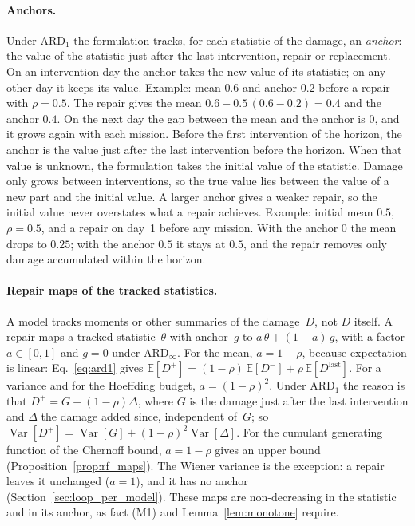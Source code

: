 \documentclass[11pt,a4paper]{article}
\theoremstyle{plain}
\theoremstyle{definition}
\theoremstyle{remark}
\begin{document}
\paragraph{Anchors.}
Under $\text{ARD}_1$ the formulation tracks, for each statistic of the damage, an \emph{anchor}: the value of the statistic just after the last intervention, repair or replacement.
On an intervention day the anchor takes the new value of its statistic; on any other day it keeps its value.
Example: mean $0.6$ and anchor $0.2$ before a repair with $\rho = 0.5$.
The repair gives the mean $0.6 - 0.5\,(0.6 - 0.2) = 0.4$ and the anchor $0.4$.
On the next day the gap between the mean and the anchor is $0$, and it grows again with each mission.
Before the first intervention of the horizon, the anchor is the value just after the last intervention before the horizon.
When that value is unknown, the formulation takes the initial value of the statistic.
Damage only grows between interventions, so the true value lies between the value of a new part and the initial value.
A larger anchor gives a weaker repair, so the initial value never overstates what a repair achieves.
Example: initial mean $0.5$, $\rho = 0.5$, and a repair on day~1 before any mission.
With the anchor $0$ the mean drops to $0.25$; with the anchor $0.5$ it stays at $0.5$, and the repair removes only damage accumulated within the horizon.

\paragraph{Repair maps of the tracked statistics.}
A model tracks moments or other summaries of the damage~$D$, not $D$ itself.
A repair maps a tracked statistic~$\theta$ with anchor~$g$ to $a\,\theta + (1-a)\,g$, with a factor $a \in [0,1]$ and $g = 0$ under $\text{ARD}_\infty$.
For the mean, $a = 1-\rho$, because expectation is linear: Eq.~\eqref{eq:ard1} gives $\mathbb{E}[D^+] = (1-\rho)\,\mathbb{E}[D^-] + \rho\,\mathbb{E}[D^{\mathrm{last}}]$.
For a variance and for the Hoeffding budget, $a = (1-\rho)^2$.
Under $\text{ARD}_1$ the reason is that $D^+ = G + (1-\rho)\Delta$, where $G$ is the damage just after the last intervention and $\Delta$ the damage added since, independent of~$G$; so $\operatorname{Var}[D^+] = \operatorname{Var}[G] + (1-\rho)^2\operatorname{Var}[\Delta]$.
For the cumulant generating function of the Chernoff bound, $a = 1-\rho$ gives an upper bound (Proposition~\ref{prop:rf_maps}).
The Wiener variance is the exception: a repair leaves it unchanged ($a = 1$), and it has no anchor (Section~\ref{sec:loop_per_model}).
These maps are non-decreasing in the statistic and in its anchor, as fact (M1) and Lemma~\ref{lem:monotone} require.
\end{document}
